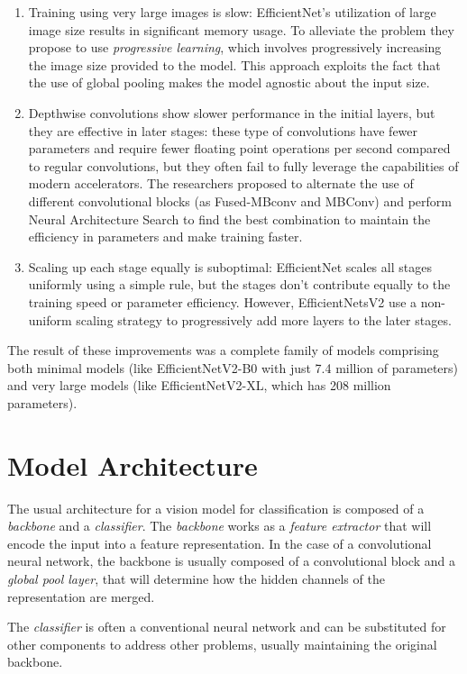 \begin{enumerate}
    \item Training using very large images is slow: EfficientNet's utilization of large image size results in significant memory usage. To alleviate the problem they propose to use \textit{progressive learning}, which involves progressively increasing the image size provided to the model. This approach exploits the fact that the use of global pooling makes the model agnostic about the input size.
    \item Depthwise convolutions show slower performance in the initial layers, but they are effective in later stages: these type of convolutions have fewer parameters and require fewer floating point operations per second compared to regular convolutions, but they often fail to fully leverage the capabilities of modern accelerators. The researchers proposed to alternate the use of different convolutional blocks (as Fused-MBconv and MBConv) and perform Neural Architecture Search to find the best combination to maintain the efficiency in parameters and make training faster.
    \item Scaling up each stage equally is suboptimal: EfficientNet scales all stages uniformly using a simple rule, but the stages don't contribute equally to the training speed or parameter efficiency.  However, EfficientNetsV2 use a non-uniform scaling strategy to progressively add more layers to the later stages. 
\end{enumerate}

The result of these improvements was a complete family of models comprising both minimal models (like EfficientNetV2-B0 with just 7.4 million of parameters) and very large models (like EfficientNetV2-XL, which has 208 million parameters).

\section{Model Architecture}\label{archModel}
The usual architecture for a vision model for classification is composed of a \textit{backbone} and a \textit{classifier}. The \textit{backbone} works as a \textit{feature extractor} that will encode the input into a feature representation. In the case of a convolutional neural network, the backbone is usually composed of a convolutional block and a \textit{global pool layer}, that will determine how the hidden channels of the representation are merged.

The \textit{classifier} is often a conventional neural network and can be substituted for other components to address other problems, usually maintaining the original backbone.

